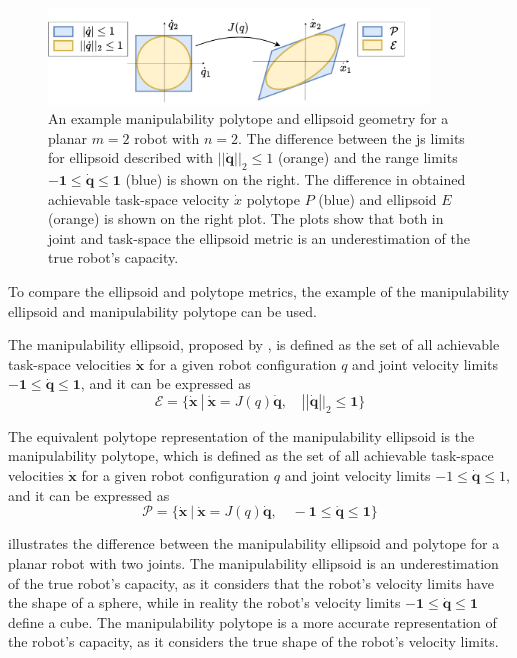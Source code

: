 \begin{figure}[!h]
    \centering
    \includegraphics[width=0.9\textwidth]{Chapters/imgs/ellip_poly.pdf}
    \caption{An example manipulability polytope and ellipsoid geometry for a planar $m=2$ robot with $n=2$. The difference between the \gls{js} limits for ellipsoid described with $||\dot{\bm{q}}||_2\leq1$ (orange) and the range limits $\bm{-1}\leq\dot{\bm{q}}\leq\bm{1}$ (blue) is shown on the right. The difference in obtained achievable task-space velocity $\dot{{x}}$ polytope ${P}$ (blue) and ellipsoid ${E}$ (orange) is shown on the right plot. The plots show that both in joint and task-space the ellipsoid metric is an underestimation of the true robot's capacity.}
    \label{fig:ellip_poly_dif_revisit}
\end{figure}

To compare the ellipsoid and polytope metrics, the example of the manipulability ellipsoid and manipulability polytope can be used. 

The manipulability ellipsoid, proposed by \citet{yoshikawa1985manipulability}, is defined as the set of all achievable task-space velocities ${\dot{\bm{x}}}$ for a given robot configuration ${q}$ and joint velocity limits $-\bm{1} \leq {\dot{\bm{q}}}\leq \bm{1}$, and it can be expressed as
\begin{equation}\label{eq:manip_ellipsoid}
\mathcal{E} = \{ \dot{\bm{x}} ~|~ \dot{\bm{x}} = J({q})\dot{\bm{q}}, \quad ||\dot{\bm{q}}||_2 \leq \bm{1} \}
\end{equation}

The equivalent polytope representation of the manipulability ellipsoid is the manipulability polytope, which is defined as the set of all achievable task-space velocities ${\dot{\bm{x}}}$ for a given robot configuration ${q}$ and joint velocity limits $-1 \leq {\dot{\bm{q}}}\leq 1$, and it can be expressed as
\begin{equation}\label{eq:manip_polytope}
\mathcal{P} = \{ \dot{\bm{x}} ~|~ \dot{\bm{x}} = J({q})\dot{\bm{q}}, \quad -\bm{1} \leq \dot{\bm{q}} \leq \bm{1} \}
\end{equation}

 illustrates the difference between the manipulability ellipsoid and polytope for a planar robot with two joints. The manipulability ellipsoid is an underestimation of the true robot's capacity, as it considers that the robot's velocity limits have the shape of a sphere, while in reality the robot's velocity limits $-\bm{1} \leq {\dot{\bm{q}}}\leq \bm{1}$ define a cube. The manipulability polytope is a more accurate representation of the robot's capacity, as it considers the true shape of the robot's velocity limits. 

